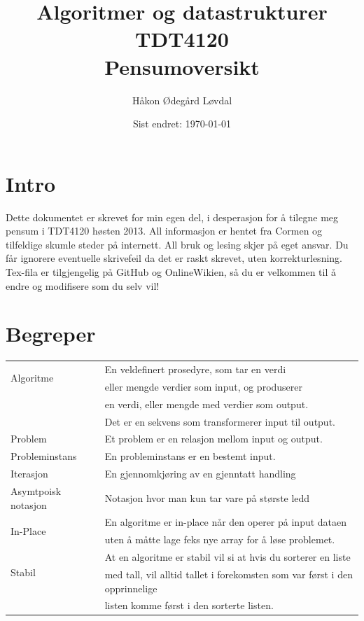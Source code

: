 \documentclass[a4paper, norsk,  10pt]{article}
\begin{document}
\title{Algoritmer og datastrukturer\\TDT4120\\Pensumoversikt}
\author{Håkon Ødegård Løvdal}
\date{Sist endret: \today}
\maketitle
\thispagestyle{empty}

\newpage

\section{Intro}

Dette dokumentet er skrevet for min egen del, i desperasjon for å tilegne meg pensum i TDT4120 høsten 2013. All informasjon er hentet fra Cormen og tilfeldige skumle steder på internett. All bruk og lesing skjer på eget ansvar. Du får ignorere eventuelle skrivefeil da det er raskt skrevet, uten korrekturlesning. Tex-fila er tilgjengelig på GitHub og OnlineWikien, så du er velkommen til å endre og modifisere som du selv vil! 

\section{Begreper}

\begin{center}
\begin{tabular}{|l|l|} 
\hline
\multirow{2}{*}{Algoritme} & En veldefinert prosedyre, som tar en verdi\\
	 & eller mengde verdier som input, og produserer\\
	& en verdi, eller mengde med verdier som output.\\
	& Det er en sekvens som transformerer input til output.\\ \hline 
	Problem			& Et problem er en relasjon mellom input og output. \\ \hline
	Probleminstans		& En probleminstans er en bestemt input. \\ \hline
	Iterasjon 		& En gjennomkjøring av en gjenntatt handling\\ \hline
	Asymtpoisk notasjon	& Notasjon hvor man kun tar vare på største ledd\\ \hline
\multirow{2}{*}{In-Place} & En algoritme er in-place når den operer på input dataen \\
	& uten å måtte lage feks nye array for å løse problemet.  \\ \hline
\multirow{2}{*}{Stabil} & At en algoritme er stabil vil si at hvis du sorterer en liste\\ 
	&med tall, vil alltid tallet i forekomsten som var først i den opprinnelige\\
	&listen komme først i den sorterte listen. \\ \hline
\end{tabular}
\end{center}
\end{document}
